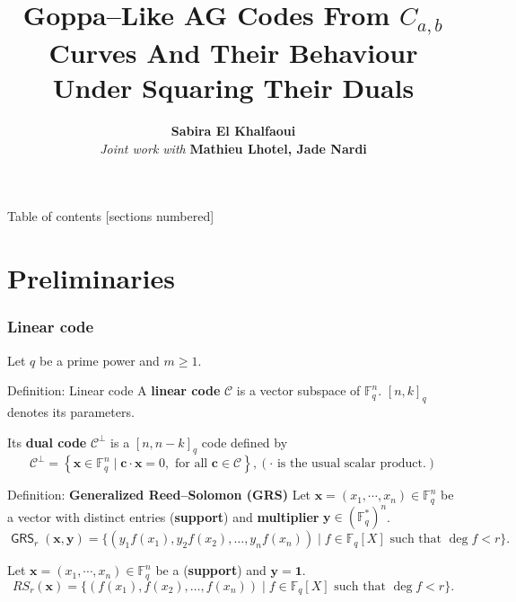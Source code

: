 \documentclass[
10pt, %
%
aspectratio=169, %
]{beamer}
\title[Goppa-Like AG codes Distinguisher]{Goppa–Like AG Codes From $C_{a,b}$ Curves And Their Behaviour Under Squaring Their Duals}
\author[SEK]{\textbf{Sabira El Khalfaoui} \vspace{0.3cm}\\\vspace{1cm} \textit{\textcolor{ballblue}{Joint work with}} \textbf{Mathieu Lhotel, Jade Nardi}}
\institute[]{\large{\textbf{IRMAR} \\ \smallskip \textit{\textcolor{ballblue}{GAE seminar}}}}
\date[Mai 2023]
\theoremstyle{plain}%
\theoremstyle{definition}
\theoremstyle{remark}
\newcommand{\calC}{\mathcal{C}}
\newcommand{\fq}{\mathbb{F}_{q}}
\newcommand{\GRS}{\operatorname{\mathsf{GRS}}}
\begin{document}
	
	\maketitle
	
	\begin{frame}{Table of contents}
		[sections numbered]
		\tableofcontents%
	\end{frame}
	
	\section{Preliminaries}
	
	\begin{frame}
		\frametitle{Linear code}
		Let $q$ be a prime power and $m \geq 1$. 
		\begin{block}{Definition: Linear code}
			A \textbf{linear code} $\calC$ is a vector subspace of $\fq^n$. $[n,k]_{q}$ denotes its parameters.
		\end{block}

	 Its \textbf{dual code} $\calC^{\perp}$ is a $[n,n-k]_{q}$ code defined by 
	\[\calC^{\perp}=\left\lbrace \mathbf{x} \in \fq^n \mid \mathbf{c} \cdot \mathbf{x}=0, \text{ for all } \mathbf{c} \in \calC \right\rbrace, (\text{$\cdot$ is the usual scalar product.})\]  
	
		\begin{block}{Definition: \textbf{Generalized Reed--Solomon (GRS)}}
			Let $\mathbf{x}=(x_1,\cdots,x_n) \in \fq^n$ be a vector with distinct entries (\textbf{support}) and \textbf{multiplier} $\mathbf{y} \in (\fq^*)^n$.
			\vspace{-0.7em}
			\[\GRS_r(\mathbf{x},\mathbf{y})=\{(y_1f(x_1),y_2f(x_2),\dots,y_nf(x_n)) \mid f \in \fq[X] \text{ such that } \deg f < r \}.\]
		\end{block}
	\begin{tcolorbox}[colback=aliceblue]
		Let $\mathbf{x}=(x_1,\cdots,x_n) \in \fq^n$ be a (\textbf{support}) and $\mathbf{y} = \mathbf{1}$.
		\vspace{-0.7em}
		\[RS_r(\mathbf{x})=\{(f(x_1),f(x_2),\dots,f(x_n)) \mid f \in \fq[X] \text{ such that } \deg f < r \}.\]
	\end{tcolorbox}
	\end{frame}
\end{document}
